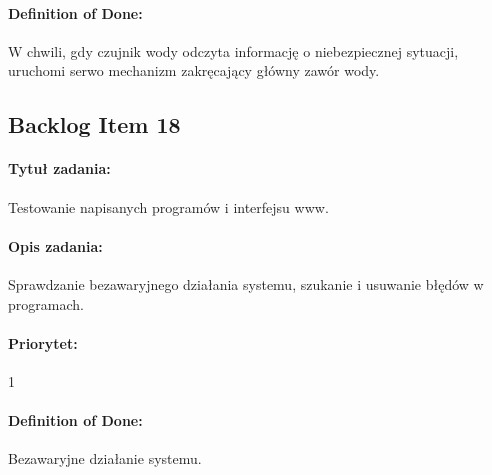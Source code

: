 	\paragraph{Definition of Done:}
	W chwili, gdy czujnik wody odczyta informację o niebezpiecznej sytuacji, uruchomi serwo mechanizm zakręcający główny zawór wody.


\subsection{Backlog Item 18}
\paragraph{Tytuł zadania:}
Testowanie napisanych programów i interfejsu www.

\paragraph{Opis zadania:} 
Sprawdzanie bezawaryjnego działania systemu, szukanie i usuwanie błędów w programach.

\paragraph{Priorytet:} 
1

\paragraph{Definition of Done:}
Bezawaryjne działanie systemu.


	
